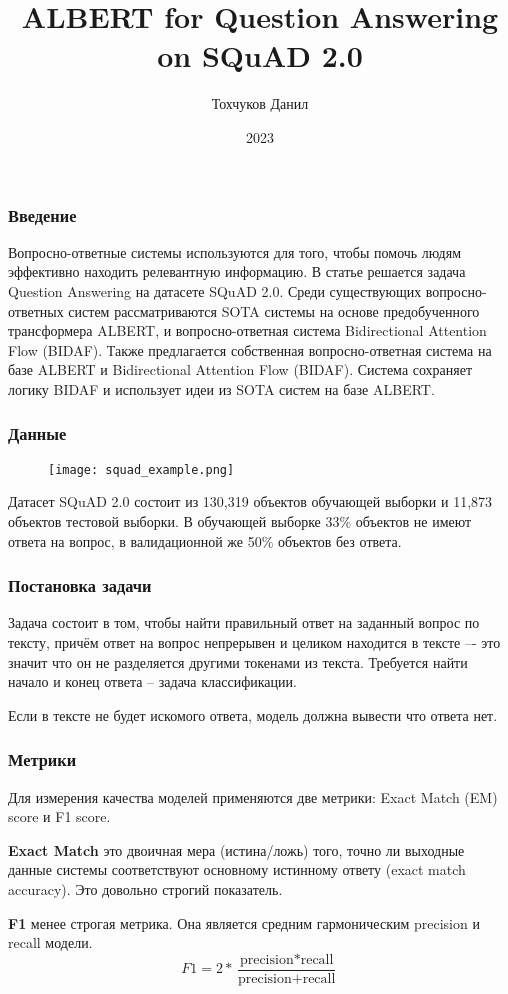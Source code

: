\documentclass[xcolor={dvipsnames}]{beamer}
\title[ALBERT for SQuAD 2.0] %
{ALBERT for Question Answering on SQuAD 2.0}
\author[Тохчуков Данил] %
{Тохчуков Данил}
\institute[Institute] %
{
    Факультет вычислительной математики и кибернетики\\
    МГУ имени М. В. Ломоносова
}
\date[Article 2023] %
{2023}
\begin{document}
\frame{\titlepage}



\begin{frame}
\frametitle{Введение}

\begin{center}
    Вопросно-ответные системы используются для того, чтобы помочь людям эффективно находить релевантную информацию.
    В статье решается задача Question Answering на датасете SQuAD 2.0.
    Среди существующих вопросно-ответных систем рассматриваются SOTA системы на основе предобученного трансформера ALBERT, и вопросно-ответная система Bidirectional Attention Flow (BIDAF). Также предлагается собственная вопросно-ответная система на базе ALBERT и Bidirectional Attention Flow (BIDAF). Система сохраняет логику BIDAF и использует идеи из SOTA систем на базе ALBERT.
\end{center}

\end{frame}

\begin{frame}
\frametitle{Данные}

\begin{figure}[!ht]
    \centering
    \texttt{[image: squad\_example.png]}
\end{figure}

Датасет SQuAD 2.0 состоит из 130,319 объектов обучающей выборки и 11,873 объектов тестовой выборки. В обучающей выборке 33\% объектов не имеют ответа на вопрос, в валидационной же 50\% объектов без ответа.

\end{frame}

\begin{frame}
\frametitle{Постановка задачи}
Задача состоит в том, чтобы найти правильный ответ на заданный вопрос по тексту, причём ответ на
вопрос непрерывен и целиком находится в тексте –- это значит что он не разделяется другими токенами
из текста. Требуется найти начало и конец ответа -- задача классификации.

Если в тексте не будет искомого ответа, модель должна вывести что ответа нет.

\end{frame}

\begin{frame}
\frametitle{Метрики}
Для измерения качества моделей применяются две метрики: Exact Match (EM) score и F1
score.

\textbf{Exact Match} это двоичная мера (истина/ложь) того, точно ли выходные данные системы соответствуют
основному истинному ответу (exact match accuracy). Это довольно строгий показатель.

\textbf{F1} менее строгая метрика. Она является средним гармоническим precision и recall модели. \\
$$F1 = 2*\frac{\text{precision}*\text{recall}}{\text{precision} + \text{recall}}$$
\end{frame}
\end{document}

